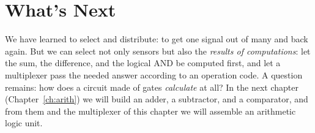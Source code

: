 \section{What's Next}

We have learned to select and distribute: to get one signal out of many and
back again. But we can select not only sensors but also the \emph{results of
computations}: let the sum, the difference, and the logical AND be computed
first, and let a multiplexer pass the needed answer according to an operation
code. A question remains: how does a circuit made of gates \emph{calculate} at
all? In the next chapter (Chapter~\ref{ch:arith}) we will build an adder, a
subtractor, and a comparator, and from them and the multiplexer of this chapter
we will assemble an arithmetic logic unit.
